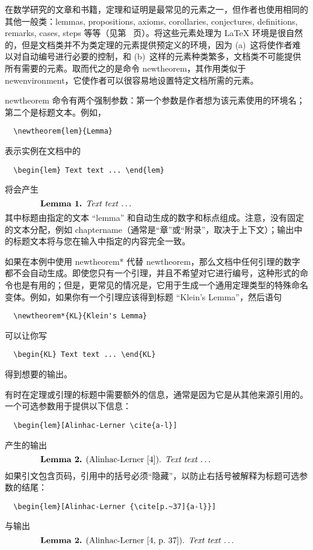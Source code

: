 \documentclass[11pt,twoside,fontset=sikou,punct=kaiming]{ctexart}
\providecommand{\qq}[1]{“#1”}
\newcommand{\ntt}{%
  \ttfamily\mdseries\upshape%
}
\DeclareRobustCommand{\cn}[1]{{\ntt\bslchar#1}}
\def\latex/{{\protect\LaTeX}}
\begin{document}
在数学研究的文章和书籍，定理和证明是最常见的元素之一，但作者也使用相同的其他一般类：lemmas, propositions, axioms, corollaries, conjectures, definitions, remarks, cases, steps 等等（见第~\pageref{thmstyle:list} 页）。将这些元素处理为 \latex/ 环境是很自然的，但是文档类并不为类定理的元素提供预定义的环境，因为 (a)~这将使作者难以对自动编号进行必要的控制，和 (b)~这样的元素种类繁多，文档类不可能提供所有需要的元素。取而代之的是命令 \cn{newtheorem}，其作用类似于 \cn{newenvironment}，它使作者可以很容易地设置特定文档所需的元素。

\cn{newtheorem} 命令有两个强制参数：第一个参数是作者想为该元素使用的环境名；第二个是标题文本。例如，
\begin{verbatim}
  \newtheorem{lem}{Lemma}
\end{verbatim}
表示实例在文档中的
\begin{verbatim}
  \begin{lem} Text text ... \end{lem}
\end{verbatim}
将会产生
\[\makebox[.8\columnwidth]{%
  \textbf{Lemma 1.} \textit{Text text \dots}\hfill}\]
其中标题由指定的文本 \qq{lemma} 和自动生成的数字和标点组成。注意，没有固定的文本分配，例如 \cn{chaptername}（通常是“章”或“附录”，取决于上下文）；输出中的标题文本将与您在输入中指定的内容完全一致。

如果在本例中使用 \cn{newtheorem*} 代替 \cn{newtheorem}，那么文档中任何引理的数字都不会自动生成。即使您只有一个引理，并且不希望对它进行编号，这种形式的命令也是有用的；但是，更常见的情况是，它用于生成一个通用定理类型的特殊命名变体。例如，如果你有一个引理应该得到标题 \qq{Klein's Lemma}，然后语句
\begin{verbatim}
  \newtheorem*{KL}{Klein's Lemma}
\end{verbatim}
可以让你写
\begin{verbatim}
  \begin{KL} Text text ... \end{KL}
\end{verbatim}
得到想要的输出。

有时在定理或引理的标题中需要额外的信息，通常是因为它是从其他来源引用的。一个可选参数用于提供以下信息：
\begin{verbatim}
  \begin{lem}[Alinhac-Lerner \cite{a-l}]
\end{verbatim}
产生的输出
\[\makebox[.8\columnwidth]{%
  \textbf{Lemma 2.} (Alinhac-Lerner [4]). \textit{Text text \dots}\hfill}\]
如果引文包含页码，引用中的括号必须“隐藏”，以防止右括号被解释为标题可选参数的结尾：
\begin{verbatim}
  \begin{lem}[Alinhac-Lerner {\cite[p.~37]{a-l}}]
\end{verbatim}
与输出
\[\makebox[.8\columnwidth]{%
  \textbf{Lemma 2.} (Alinhac-Lerner [4, p.~37]). \textit{Text text \dots}\hfill}\]
\end{document}
